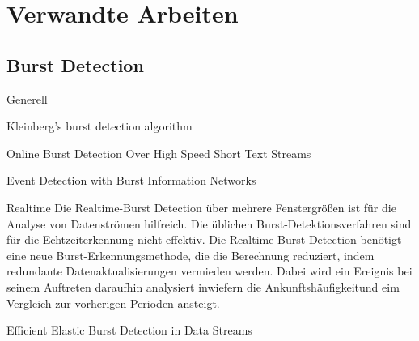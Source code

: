 \section{Verwandte Arbeiten}
\subsection{Burst Detection}
Generell

Kleinberg’s burst detection algorithm

Online Burst Detection Over High Speed Short Text Streams

Event Detection with Burst Information Networks

Realtime
Die Realtime-Burst Detection über mehrere Fenstergrößen ist für die Analyse von Datenströmen hilfreich. Die üblichen Burst-Detektionsverfahren sind für die Echtzeiterkennung nicht effektiv. Die Realtime-Burst Detection benötigt eine neue Burst-Erkennungsmethode, die die Berechnung reduziert, indem redundante Datenaktualisierungen vermieden werden. Dabei wird ein Ereignis bei seinem Auftreten daraufhin analysiert inwiefern die Ankunftshäufigkeitund eim Vergleich zur vorherigen Perioden ansteigt.

Efficient Elastic Burst Detection in Data Streams 

\cite{10.1007978-3-642-36973-5_22}